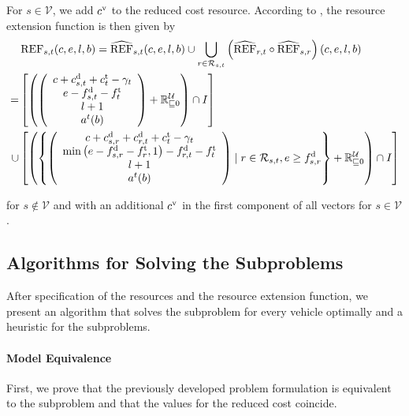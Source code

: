 For $s\in\mathcal{V}$, we add $c^{\operatorname{v}}$ to the reduced cost resource. According to , the resource extension function is then given by
\begin{align*}
	& \operatorname{REF}_{s,t}(c,e,l,b) = \widehat{\operatorname{REF}}_{s,t}(c,e,l,b)\cup\bigcup_{r\in\mathcal{R}_{s,t}}\left(\widehat{\operatorname{REF}}_{r,t}\circ\widehat{\operatorname{REF}}_{s,r}\right)(c,e,l,b) \\
	= & \left[\left(\left(\begin{array}{c}
		c + c^{\operatorname{d}}_{s,t} + c^{\operatorname{t}}_t - \gamma_t \\ e - f^{\operatorname{d}}_{s,t} - f^{\operatorname{t}}_t \\ l + 1 \\ a^t(b)
	\end{array} \right) + \mathbb{R}^{\mathcal{U}}_{\sqsubseteq 0}\right)\cap I\right] \\
	\cup & \left[\left(\left\{\left(\begin{array}{c}
		c + c^{\operatorname{d}}_{s,r} + c^{\operatorname{d}}_{r,t} + c^{\operatorname{t}}_t - \gamma_t \\ \min\left(e-f^{\operatorname{d}}_{s,r}-f^{\operatorname{t}}_r,1\right) - f^{\operatorname{d}}_{r,t} - f^{\operatorname{t}}_t \\ l + 1 \\ a^t(b)
	\end{array}\right) \mid r\in\mathcal{R}_{s,t}, e\geq f^{\operatorname{d}}_{s,r}\right\} + \mathbb{R}^{\mathcal{U}}_{\sqsubseteq 0}\right)\cap I\right]
\end{align*}

for $s\notin\mathcal{V}$ and with an additional $c^{\operatorname{v}}$ in the first component of all vectors for $s\in\mathcal{V}$.


\subsection{Algorithms for Solving the Subproblems}
\label{sec:algorithms_subproblem}

After specification of the resources and the resource extension function, we present an algorithm that solves the subproblem for every vehicle optimally and a heuristic for the subproblems.

\paragraph{Model Equivalence} \parfill

First, we prove that the previously developed problem formulation is equivalent to the subproblem and that the values for the reduced cost coincide.

